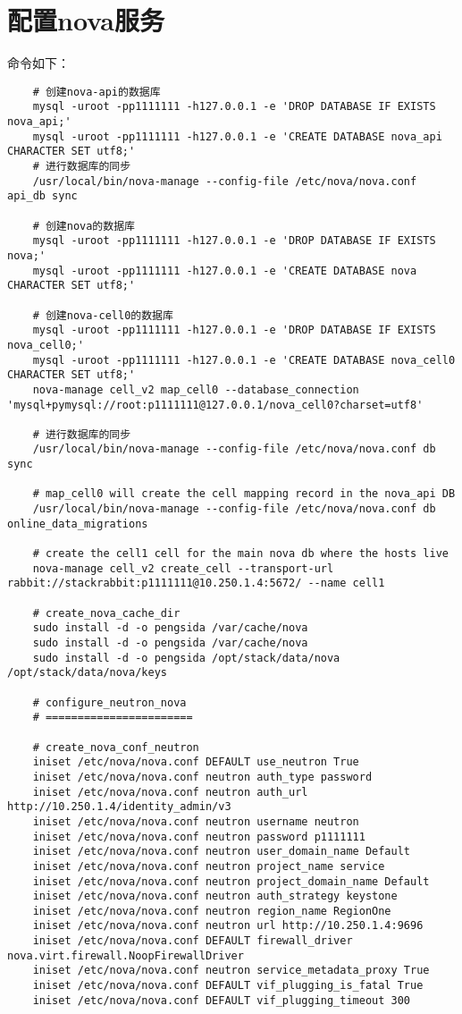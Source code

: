 \documentclass[a4paper,left=1.5cm,right=1.5cm,11pt]{article}
\begin{document}
\section{配置nova服务}
	命令如下：
	\begin{lstlisting}
	# 创建nova-api的数据库
	mysql -uroot -pp1111111 -h127.0.0.1 -e 'DROP DATABASE IF EXISTS nova_api;'
	mysql -uroot -pp1111111 -h127.0.0.1 -e 'CREATE DATABASE nova_api CHARACTER SET utf8;'
	# 进行数据库的同步
	/usr/local/bin/nova-manage --config-file /etc/nova/nova.conf api_db sync
	
	# 创建nova的数据库	
	mysql -uroot -pp1111111 -h127.0.0.1 -e 'DROP DATABASE IF EXISTS nova;'
	mysql -uroot -pp1111111 -h127.0.0.1 -e 'CREATE DATABASE nova CHARACTER SET utf8;'

	# 创建nova-cell0的数据库	
	mysql -uroot -pp1111111 -h127.0.0.1 -e 'DROP DATABASE IF EXISTS nova_cell0;'
	mysql -uroot -pp1111111 -h127.0.0.1 -e 'CREATE DATABASE nova_cell0 CHARACTER SET utf8;'
	nova-manage cell_v2 map_cell0 --database_connection 'mysql+pymysql://root:p1111111@127.0.0.1/nova_cell0?charset=utf8'
	
	# 进行数据库的同步
	/usr/local/bin/nova-manage --config-file /etc/nova/nova.conf db sync

	# map_cell0 will create the cell mapping record in the nova_api DB
	/usr/local/bin/nova-manage --config-file /etc/nova/nova.conf db online_data_migrations
	
	# create the cell1 cell for the main nova db where the hosts live
	nova-manage cell_v2 create_cell --transport-url rabbit://stackrabbit:p1111111@10.250.1.4:5672/ --name cell1

	# create_nova_cache_dir
	sudo install -d -o pengsida /var/cache/nova
	sudo install -d -o pengsida /var/cache/nova
	sudo install -d -o pengsida /opt/stack/data/nova /opt/stack/data/nova/keys
	
	# configure_neutron_nova
	# =======================

	# create_nova_conf_neutron
	iniset /etc/nova/nova.conf DEFAULT use_neutron True
	iniset /etc/nova/nova.conf neutron auth_type password
	iniset /etc/nova/nova.conf neutron auth_url http://10.250.1.4/identity_admin/v3
	iniset /etc/nova/nova.conf neutron username neutron
	iniset /etc/nova/nova.conf neutron password p1111111
	iniset /etc/nova/nova.conf neutron user_domain_name Default
	iniset /etc/nova/nova.conf neutron project_name service
	iniset /etc/nova/nova.conf neutron project_domain_name Default
	iniset /etc/nova/nova.conf neutron auth_strategy keystone
	iniset /etc/nova/nova.conf neutron region_name RegionOne
	iniset /etc/nova/nova.conf neutron url http://10.250.1.4:9696
	iniset /etc/nova/nova.conf DEFAULT firewall_driver nova.virt.firewall.NoopFirewallDriver
	iniset /etc/nova/nova.conf neutron service_metadata_proxy True
	iniset /etc/nova/nova.conf DEFAULT vif_plugging_is_fatal True
	iniset /etc/nova/nova.conf DEFAULT vif_plugging_timeout 300
	\end{lstlisting}
\end{document}
